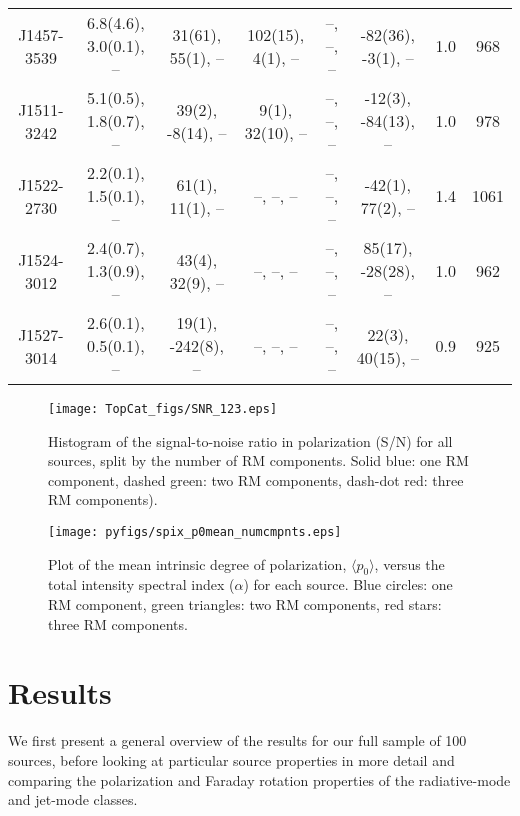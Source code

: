 \documentclass{mnras}
\begin{document}
\begin{table*}
\begin{tabular}{cccccccc}
J1457-3539 & 6.8(4.6), 3.0(0.1), -- & 31(61), 55(1), -- & 102(15), 4(1), -- & --, --, -- & -82(36), -3(1), -- & 1.0 & 968 \\ 

J1511-3242 & 5.1(0.5), 1.8(0.7), -- & 39(2), -8(14), -- & 9(1), 32(10), -- & --, --, -- & -12(3), -84(13), -- & 1.0 & 978 \\ 

J1522-2730 & 2.2(0.1), 1.5(0.1), -- & 61(1), 11(1), -- & --, --, -- & --, --, -- & -42(1), 77(2), -- & 1.4 & 1061 \\ 

J1524-3012 & 2.4(0.7), 1.3(0.9), -- & 43(4), 32(9), -- & --, --, -- & --, --, -- & 85(17), -28(28), -- & 1.0 & 962 \\ 

J1527-3014 & 2.6(0.1), 0.5(0.1), -- & 19(1), -242(8), -- & --, --, -- & --, --, -- & 22(3), 40(15), -- & 0.9 & 925 \\
      \hline
   \end{tabular}%
\end{table*}


\begin{figure} 
\centering
    \texttt{[image: TopCat\_figs/SNR\_123.eps]} 
    \caption{ {\small Histogram of the signal-to-noise ratio in polarization (S/N) for all sources, split by the number of RM components. 
    Solid blue: one RM component, dashed green: two RM components, dash-dot red: three RM components). } }
    \label{S/N}
\end{figure}    

\begin{figure} 
\centering
    \texttt{[image: pyfigs/spix\_p0mean\_numcmpnts.eps]}
    \caption{ {\small Plot of the mean intrinsic degree of polarization, $\langle p_0 \rangle$, versus the total intensity spectral index ($\alpha$) for each source. 
    Blue circles: one RM component, green triangles: two RM components, red stars: three RM components. } }
    \label{spixp0}
\end{figure}   


\section{Results}
We first present a general overview of the results for our full sample of 100 sources, before looking at particular source properties in more detail and comparing the polarization and Faraday rotation properties of the radiative-mode and jet-mode classes. 
\end{document}
